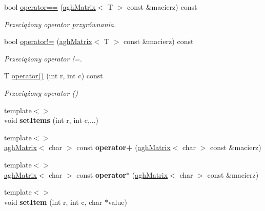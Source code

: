 \begin{DoxyCompactItemize}
bool \hyperlink{classaghMatrix_ad101fd2abddb7f94529fe7c52df6c480}{operator==} (\hyperlink{classaghMatrix}{agh\-Matrix}$<$ T $>$ const \&macierz) const 
\begin{DoxyCompactList}\small\item\em Przeciążony operator przyrównania. \end{DoxyCompactList}\item 
bool \hyperlink{classaghMatrix_a6085eb4f4090144039d3a66569214731}{operator!=} (\hyperlink{classaghMatrix}{agh\-Matrix}$<$ T $>$ const \&macierz) const 
\begin{DoxyCompactList}\small\item\em Przeciążony operator !=. \end{DoxyCompactList}\item 
T \hyperlink{classaghMatrix_a0e6db788e47230f0f8501eab79005dc4}{operator()} (int r, int c) const 
\begin{DoxyCompactList}\small\item\em Przeciążony operator () \end{DoxyCompactList}\item 
\hypertarget{classaghMatrix_a1677a3cff6e87d8b12dedb2cb1c4396c}{{\footnotesize template$<$$>$ }\\void {\bfseries set\-Items} (int r, int c,...)}\label{classaghMatrix_a1677a3cff6e87d8b12dedb2cb1c4396c}

\item 
\hypertarget{classaghMatrix_a8b70dfefa5c12796519dcc2c73efd653}{{\footnotesize template$<$$>$ }\\\hyperlink{classaghMatrix}{agh\-Matrix}$<$ char $>$ const {\bfseries operator+} (\hyperlink{classaghMatrix}{agh\-Matrix}$<$ char $>$ const \&macierz)}\label{classaghMatrix_a8b70dfefa5c12796519dcc2c73efd653}

\item 
\hypertarget{classaghMatrix_afaf30ce991ca883228faa5f9b42ded9e}{{\footnotesize template$<$$>$ }\\\hyperlink{classaghMatrix}{agh\-Matrix}$<$ char $>$ const {\bfseries operator$\ast$} (\hyperlink{classaghMatrix}{agh\-Matrix}$<$ char $>$ const \&macierz)}\label{classaghMatrix_afaf30ce991ca883228faa5f9b42ded9e}

\item 
\hypertarget{classaghMatrix_a9c07b6e6d5f6c026f5bf3da82d83b7b2}{{\footnotesize template$<$$>$ }\\void {\bfseries set\-Item} (int r, int c, char $\ast$value)}\label{classaghMatrix_a9c07b6e6d5f6c026f5bf3da82d83b7b2}


\end{DoxyCompactItemize}
